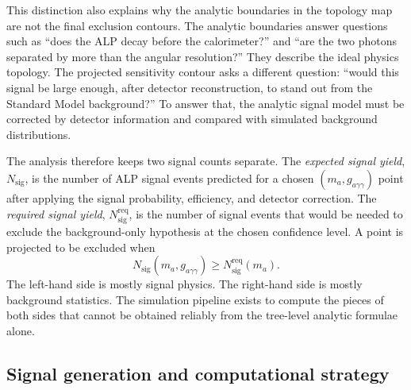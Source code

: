 \documentclass[12pt,a4paper]{article}
\newcommand{\gagg}{g_{a\gamma\gamma}}
\begin{document}
This distinction also explains why the analytic boundaries in the topology map
are not the final exclusion contours. The analytic boundaries answer questions
such as ``does the ALP decay before the calorimeter?'' and ``are the two photons
separated by more than the angular resolution?'' They describe the ideal
physics topology. The projected sensitivity contour asks a different question:
``would this signal be large enough, after detector reconstruction, to stand
out from the Standard Model background?'' To answer that, the analytic signal
model must be corrected by detector information and compared with simulated
background distributions.

The analysis therefore keeps two signal counts separate.
The \emph{expected signal yield}, $N_\mathrm{sig}$, is the number of ALP signal
events predicted for a chosen $(m_a,\gagg)$ point after applying the signal
probability, efficiency, and detector correction.
The \emph{required signal yield}, $N_\mathrm{sig}^\mathrm{req}$, is the number
of signal events that would be needed to exclude the background-only
hypothesis at the chosen confidence level.
A point is projected to be excluded when
\begin{equation}
    N_\mathrm{sig}(m_a,\gagg)
    \geq
    N_\mathrm{sig}^\mathrm{req}(m_a).
    \label{eq:expected_vs_required}
\end{equation}
The left-hand side is mostly signal physics. The right-hand side is mostly
background statistics. The simulation pipeline exists to compute the pieces of
both sides that cannot be obtained reliably from the tree-level analytic
formulae alone.

\subsection{Signal generation and computational strategy}
\end{document}
